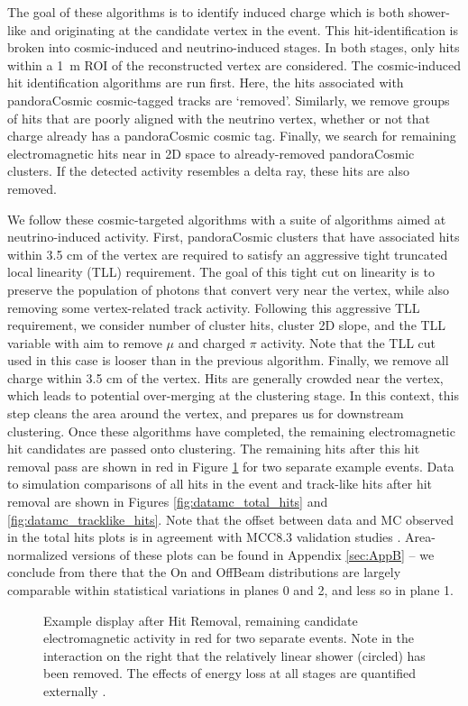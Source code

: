 \par The goal of these algorithms is to identify induced charge which is both shower-like and originating at the candidate vertex in the event. This hit-identification is broken into cosmic-induced and neutrino-induced stages.  In both stages, only hits within a 1~m ROI of the reconstructed vertex are considered. The cosmic-induced hit identification algorithms are run first.  Here, the hits associated with pandoraCosmic cosmic-tagged tracks are `removed'.  Similarly, we remove groups of hits that are poorly aligned with the neutrino vertex, whether or not that charge already has a pandoraCosmic cosmic tag. Finally, we search for remaining electromagnetic hits near in 2D space to already-removed pandoraCosmic clusters. If the detected activity resembles a delta ray, these hits are also removed. 
\par We follow these cosmic-targeted algorithms with a suite of algorithms aimed at neutrino-induced activity. First, pandoraCosmic clusters that have associated hits within 3.5 cm of the vertex are required to satisfy an aggressive tight truncated local linearity (TLL) requirement. The goal of this tight cut on linearity is to preserve the population of photons that convert very near the vertex, while also removing some vertex-related track activity. Following this aggressive TLL requirement, we consider number of cluster hits, cluster 2D slope, and the TLL variable with aim to remove $\mu$ and charged $\pi$ activity. Note that the TLL cut used in this case is looser than in the previous algorithm. Finally, we remove all charge within 3.5 cm of the vertex. Hits are generally crowded near the vertex, which leads to potential over-merging at the clustering stage. In this context, this step cleans the area around the vertex, and prepares us for downstream clustering. Once these algorithms have completed, the remaining electromagnetic hit candidates are passed onto clustering. The remaining hits after this hit removal pass are shown in red in Figure \ref{fig:hitremoval} for two separate example events. Data to simulation comparisons of all hits in the event and track-like hits after hit removal are shown in Figures \ref{fig:datamc_total_hits} and \ref{fig:datamc_tracklike_hits}.  Note that the offset between data and MC observed in the total hits plots is in agreement with MCC8.3 validation studies \cite{bib:mcc83_validation_plots}. Area-normalized versions of these plots can be found in Appendix \ref{sec:AppB} -- we conclude from there that the On and OffBeam distributions are largely comparable within statistical variations in planes 0 and 2, and less so in plane 1.   
\begin{figure}[h!]
\centering
{}
\caption{ Example display after Hit Removal, remaining candidate electromagnetic activity in red for two separate events. Note in the interaction on the right that the relatively linear shower (circled) has been removed. The effects of energy loss at all stages are quantified externally \cite{bib:davidc_missingE}.} 
\label{fig:hitremoval}
\end{figure}

